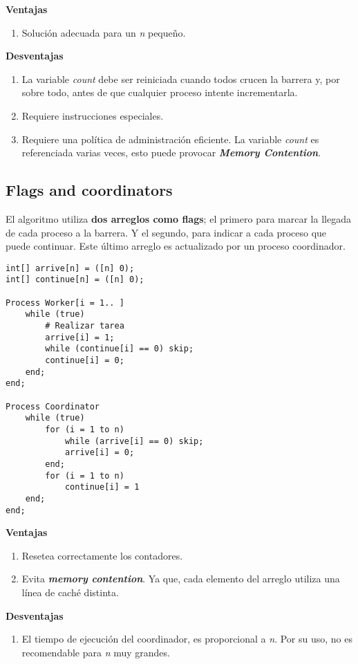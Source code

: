 \documentclass[a4paper, 11pt]{book}
\begin{document}
\textbf{Ventajas}
\begin{enumerate}
    \item Solución adecuada para un \emph{n} pequeño.
\end{enumerate}

\textbf{Desventajas}
\begin{enumerate}
    \item La variable \emph{count} debe ser reiniciada cuando todos crucen la barrera y, por sobre todo, antes de que cualquier proceso intente incrementarla.
    \item Requiere instrucciones especiales.
    \item Requiere una política de administración eficiente. La variable \emph{count} es referenciada varias veces, esto puede provocar \textbf{\emph{Memory Contention}}.
\end{enumerate}

\subsection{Flags and coordinators}

El algoritmo utiliza \textbf{dos arreglos como flags}; el primero para marcar la llegada de cada proceso a la barrera. Y el segundo, para indicar a cada proceso que puede continuar. Este último arreglo es actualizado por un proceso coordinador.

\begin{lstlisting}
int[] arrive[n] = ([n] 0);
int[] continue[n] = ([n] 0);

Process Worker[i = 1.. ]
    while (true)
        # Realizar tarea
        arrive[i] = 1;
        while (continue[i] == 0) skip;
        continue[i] = 0;
    end;
end;

Process Coordinator
    while (true)
        for (i = 1 to n)
            while (arrive[i] == 0) skip;
            arrive[i] = 0;
        end;
        for (i = 1 to n)
            continue[i] = 1
    end;
end;
\end{lstlisting}

\textbf{Ventajas}
\begin{enumerate}
    \item Resetea correctamente los contadores.
    \item Evita \textbf{\emph{memory contention}}. Ya que, cada elemento del arreglo utiliza una línea de caché distinta.
\end{enumerate}

\textbf{Desventajas}
\begin{enumerate}
    \item El tiempo de ejecución del coordinador, es proporcional a \emph{n}. Por su uso, no es recomendable para \emph{n} muy grandes.
\end{enumerate}
\end{document}
